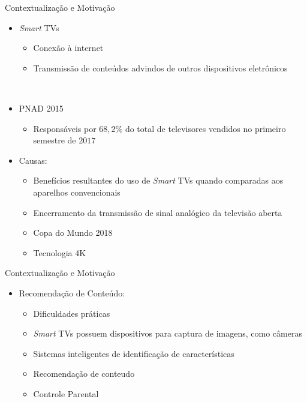 \begin{frame}{Contextualização e Motivação}
  \ \  \\[0.5cm]
    \begin{itemize}
      \item \alert{\emph{Smart} TVs}
      \begin{itemize}
          \item Conexão à internet
          \item Transmissão de conteúdos advindos de outros dispositivos eletrônicos
      \end{itemize}
      \ \ \newline
      \item \alert{PNAD 2015}
      \begin{itemize}
        \item Responsáveis por $68,2\%$ do total de televisores vendidos no primeiro semestre de $2017$
      \end{itemize}
      \item Causas:
      \begin{itemize}
        \item Benefícios resultantes do uso de \emph{Smart} TVs quando comparadas aos aparelhos convencionais
        \item Encerramento da transmissão de sinal analógico da televisão aberta
        \item Copa do Mundo 2018
        \item Tecnologia 4K
      \end{itemize}

    \end{itemize}
\end{frame}

\begin{frame}{Contextualização e Motivação}
   \ \  \\[0.1cm]
  \begin{itemize}
  \item \alert{Recomendação de Conteúdo}:
  \begin{itemize}
    \item Dificuldades práticas
    \item \emph{Smart} TVs possuem dispositivos para captura de imagens, como câmeras
    \item Sistemas inteligentes de identificação de características
    \item Recomendação de conteudo
    \item Controle Parental
  \end{itemize}
  \end{itemize}

\end{frame}

